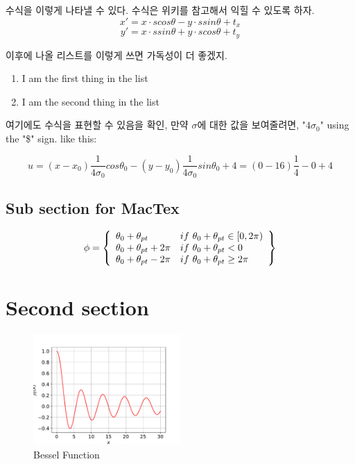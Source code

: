 \documentclass[a4paper,12pt]{article} %
\begin{document}
수식을 이렇게 나타낼 수 있다. 수식은 위키를 참고해서 익힐 수 있도록 하자.
$$x' = x \cdot s cos \theta - y \cdot s sin \theta + t_x$$
$$y' = x \cdot s sin \theta + y \cdot s cos \theta + t_y$$
\vspace{2mm}


\noindent
이후에 나올 리스트를 이렇게 쓰면 가독성이 더 좋겠지.

\vspace{2mm}
\begin{enumerate}
\item I am the first thing in the list
\item I am the second thing in the list
\end{enumerate}
\vspace{2mm}

\noindent
여기에도 수식을 표현할 수 있음을 확인, 만약 $\sigma$에 대한 값을 보여줄려면,  "$4 \sigma_0$" using the "\$" sign. like this: 

\vspace{2mm}
$$u = (x - x_0) \frac{1}{4 \sigma_0} cos \theta_0 - (y - y_0) \frac{1}{4 \sigma_0} sin \theta_0 + 4 = (0 - 16) \frac{1}{4} - 0 + 4$$
\vspace{2mm}


\subsection{Sub section for MacTex}

\vspace{2mm}
\[ \phi = \left\{ 
\begin{array}{l l}
\theta_0 + \theta_{pt} & if \ \theta_0 + \theta_{pt} \in [0,2 \pi)\\ 
\theta_0 + \theta_{pt} + 2 \pi & if \ \theta_0 + \theta_{pt} < 0\\
\theta_0 + \theta_{pt} - 2 \pi & if \ \theta_0 + \theta_{pt} \ge 2 \pi\\
\end{array} \right\}
\] 
\vspace{2mm}


\clearpage

\section{Second section}

\vspace{5mm}
\begin{figure}[!ht]
  \centering
  \includegraphics[width=0.5\textwidth]{12.pdf} %
  \caption{Bessel Function}
\end{figure}
\end{document}
